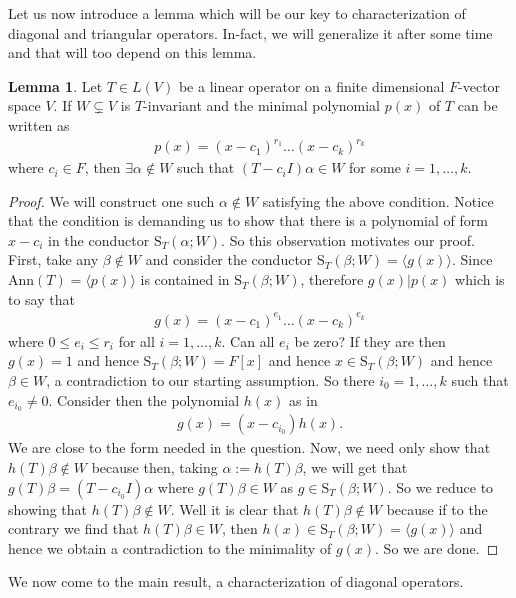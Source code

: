\documentclass[letterpaper,11pt,twoside]{article}
\theoremstyle{definition}
\theoremstyle{definition}
\theoremstyle{definition}
\theoremstyle{definition}
\newtheorem{lemma}[proposition]{\textbf{Lemma}}
\theoremstyle{definition}
\theoremstyle{definition}
\theoremstyle{remark}
\theoremstyle{definition}
\newcommand{\Ann}[1]{\text{Ann}\left(#1\right)}
\newcommand{\gen}[1]{\langle #1\rangle}
\newcommand{\cond}[3]{\text{S}_{#1}\left(#2;#3\right)}
\begin{document}
    Let us now introduce a lemma which will be our key to characterization of diagonal and triangular operators. In-fact, we will generalize it after some time and that will too depend on this lemma.
    \begin{lemma}\label{L-2.3.2}
    Let $T\in L(V)$ be a linear operator on a finite dimensional $F$-vector space $V$. If $W\subsetneq V$ is $T$-invariant and the minimal polynomial $p(x)$ of $T$ can be written as 
    \begin{align*}
        p(x) = (x-c_1)^{r_1} \dots (x-c_k)^{r_k}
    \end{align*}
    where $c_i \in F$, then $\exists \alpha\notin W$ such that $(T-c_iI)\alpha \in W$ for some $i=1,\dots,k$.
    \end{lemma}
    \begin{proof}
        We will construct one such $\alpha \notin W$ satisfying the above condition. Notice that the condition is demanding us to show that there is a polynomial of form $x-c_i$ in the conductor $\cond{T}{\alpha}{W}$. So this observation motivates our proof. First, take any $\beta \notin W$ and consider the conductor $\cond{T}{\beta}{W} = \gen{g(x)}$. Since $\Ann{T} = \gen{p(x)}$ is contained in $\cond{T}{\beta}{W}$, therefore $g(x) | p(x)$ which is to say that
        \begin{align*}
            g(x) = (x-c_1)^{e_1} \dots (x-c_k)^{e_k}
        \end{align*}
        where $0\le e_i \le r_i$ for all $i=1,\dots,k$. Can all $e_i$ be zero? If they are then $g(x) = 1$ and hence $\cond{T}{\beta}{W} = F[x]$ and hence $x\in \cond{T}{\beta}{W}$ and hence $\beta \in W$, a contradiction to our starting assumption. So there $i_0 = 1,\dots,k$ such that $e_{i_0} \neq 0$. Consider then the polynomial $h(x)$ as in 
        \begin{align*}
            g(x) = (x-c_{i_0})h(x).
        \end{align*}
        We are close to the form needed in the question. Now, we need only show that $h(T)\beta \notin W$ because then, taking $\alpha := h(T)\beta$, we will get that $g(T)\beta = (T-c_{i_0}I)\alpha $ where $g(T)\beta \in W$ as $g \in \cond{T}{\beta}{W}$. So we reduce to showing that $h(T)\beta \notin W$. Well it is clear that $h(T)\beta \notin W$ because if to the contrary we find that $h(T)\beta \in W$, then $h(x) \in \cond{T}{\beta}{W} = \gen{g(x)}$ and hence we obtain a contradiction to the minimality of $g(x)$. So we are done.
    \end{proof}
    We now come to the main result, a characterization of diagonal operators. 
\end{document}
